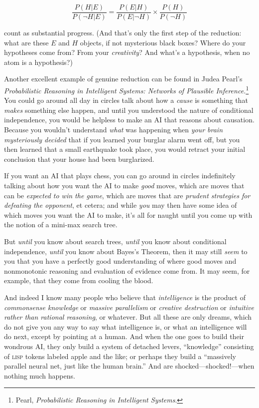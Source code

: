 \begin{equation*}
  \frac{P(H|E)}{P(\lnot H|E)} = \frac{P(E|H)}{P(E|\lnot H)} \times
  \frac{P(H)}{P(\lnot H)}
\end{equation*}



 count as substantial progress. (And that's only
the first step of the reduction: what are these $E$ and $H$ objects, if not
mysterious black boxes? Where do your hypotheses come from? From your
\textit{creativity}? And what's a hypothesis, when no
atom is a hypothesis?) 


 Another excellent example of genuine reduction can be found in
Judea Pearl's \textit{Probabilistic Reasoning in
Intelligent Systems: Networks of Plausible
Inference.}\footnote{Pearl, \textit{Probabilistic Reasoning in Intelligent
Systems}.} You could go around all day in circles
talk about how a \textit{cause} is something that \textit{makes}
something else happen, and until you understood the nature of
conditional independence, you would be helpless to make an AI that
reasons about causation. Because you wouldn't
understand \textit{what} was happening when \textit{your brain
mysteriously decided} that if you learned your burglar alarm went off,
but you then learned that a small earthquake took place, you would
retract your initial conclusion that your house had been burglarized.


 If you want an AI that plays chess, you can go around in circles
indefinitely talking about how you want the AI to make \textit{good}
moves, which are moves that can be \textit{expected to win the game},
which are moves that are \textit{prudent strategies for defeating the
opponent}, et cetera; and while \textit{you} may then have some idea of
which moves you want the AI to make, it's all for
naught until you come up with the notion of a mini-max search tree.


 But \textit{until} you know about search trees, \textit{until} you
know about conditional independence, \textit{until} you know about
Bayes's Theorem, then it may still \textit{seem} to you
that you have a perfectly good understanding of where good moves and
nonmonotonic reasoning and evaluation of evidence come from. It may
seem, for example, that they come from cooling the blood.


 And indeed I know many people who believe that
\textit{intelligence} is the product of \textit{commonsense knowledge}
or \textit{massive parallelism} or \textit{creative destruction} or
\textit{intuitive rather than rational reasoning}, or whatever. But all
these are only dreams, which do not give you any way to say what
intelligence is, or what an intelligence will do next, except by
pointing at a human. And when the one goes to build their wondrous AI,
they only build a system of detached levers,
``knowledge'' consisting of \textsc{lisp}
tokens labeled apple and the like; or perhaps they build a
``massively parallel neural net, just like the human
brain.'' And are shocked---shocked!---when nothing
much happens.


